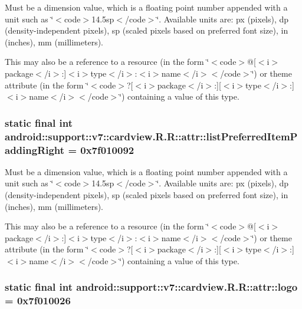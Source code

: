 Must be a dimension value, which is a floating point number appended with a unit such as \char`\"{}$<$code$>$14.5sp$<$/code$>$\char`\"{}. Available units are: px (pixels), dp (density-independent pixels), sp (scaled pixels based on preferred font size), in (inches), mm (millimeters). 

This may also be a reference to a resource (in the form \char`\"{}$<$code$>$@\mbox{[}$<$i$>$package$<$/i$>$:\mbox{]}$<$i$>$type$<$/i$>$:$<$i$>$name$<$/i$>$$<$/code$>$\char`\"{}) or theme attribute (in the form \char`\"{}$<$code$>$?\mbox{[}$<$i$>$package$<$/i$>$:\mbox{]}\mbox{[}$<$i$>$type$<$/i$>$:\mbox{]}$<$i$>$name$<$/i$>$$<$/code$>$\char`\"{}) containing a value of this type. \hypertarget{classandroid_1_1support_1_1v7_1_1cardview_1_1_r_1_1attr_3029bf6174bce2f1c8516999074616a1}{
\subsubsection[{listPreferredItemPaddingRight}]{\setlength{\rightskip}{0pt plus 5cm}static final int android::support::v7::cardview.R.R::attr::listPreferredItemPaddingRight = 0x7f010092}}
\label{classandroid_1_1support_1_1v7_1_1cardview_1_1_r_1_1attr_3029bf6174bce2f1c8516999074616a1}


Must be a dimension value, which is a floating point number appended with a unit such as \char`\"{}$<$code$>$14.5sp$<$/code$>$\char`\"{}. Available units are: px (pixels), dp (density-independent pixels), sp (scaled pixels based on preferred font size), in (inches), mm (millimeters). 

This may also be a reference to a resource (in the form \char`\"{}$<$code$>$@\mbox{[}$<$i$>$package$<$/i$>$:\mbox{]}$<$i$>$type$<$/i$>$:$<$i$>$name$<$/i$>$$<$/code$>$\char`\"{}) or theme attribute (in the form \char`\"{}$<$code$>$?\mbox{[}$<$i$>$package$<$/i$>$:\mbox{]}\mbox{[}$<$i$>$type$<$/i$>$:\mbox{]}$<$i$>$name$<$/i$>$$<$/code$>$\char`\"{}) containing a value of this type. \hypertarget{classandroid_1_1support_1_1v7_1_1cardview_1_1_r_1_1attr_1a58c8ae52263985ba349520bd1b1e27}{
\subsubsection[{logo}]{\setlength{\rightskip}{0pt plus 5cm}static final int android::support::v7::cardview.R.R::attr::logo = 0x7f010026}}
\label{classandroid_1_1support_1_1v7_1_1cardview_1_1_r_1_1attr_1a58c8ae52263985ba349520bd1b1e27}


